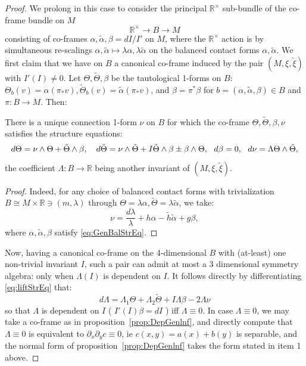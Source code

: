\documentclass[10pt,a4paper]{amsart}
\newcommand{\R}{\mathbb{R}}
\newcommand{\del}{\partial}
\begin{document}
\begin{proof}
    We prolong in this case to consider the principal $\R^\times$ sub-bundle of the co-frame bundle on $M$
    \[ \R^\times \to B\to M \]
    consisting of co-frames $\alpha, \tilde\alpha, \beta = dI/I'$ on $M$, where the $\R^\times$ action is by simultaneous re-scalings $\alpha,\tilde\alpha \mapsto \lambda\alpha, \lambda\tilde\alpha$ on the balanced contact forms $\alpha, \tilde\alpha$. We first claim that we have on $B$ a canonical co-frame induced by the pair $(M,\xi, \tilde \xi)$ with $I'(I)\ne 0$. Let $\Theta, \tilde\Theta, \beta$ be the tautological 1-forms on $B$: $\Theta_b(v) = \alpha(\pi_*v), \tilde\Theta_b(v) = \tilde\alpha(\pi_*v)$, and $\beta = \pi^*\beta$ for $b = (\alpha, \tilde\alpha, \beta)\in B$ and $\pi:B\to M$. Then:
    \begin{lem}
         There is a unique connection 1-form $\nu$ on $B$ for which the co-frame $\Theta, \tilde\Theta, \beta, \nu$ satisfies the structure equations:
    \begin{equation}\label{eq:liftStrEq}
        d\Theta = \nu\wedge\Theta + \tilde\Theta\wedge \beta, ~~~d\tilde\Theta = \nu\wedge\Tilde\Theta + I\tilde\Theta\wedge\beta \pm \beta\wedge\Theta , ~~d\beta = 0, ~~d\nu = \Lambda \Theta\wedge\tilde\Theta,
    \end{equation}
    the coefficient $\Lambda:B\to \R$ being another invariant of $(M,\xi, \tilde \xi)$.
    \end{lem}
    \begin{proof}
        Indeed, for any choice of balanced contact forms with trivialization $B\cong M\times\R\ni (m, \lambda)$ through $\Theta = \lambda\alpha, \tilde\Theta = \lambda \tilde\alpha$, we take:
    \[ \nu = \frac{d\lambda}{\lambda} + h \alpha - \tilde h \tilde\alpha + g\beta,   \]
    where $\alpha, \tilde\alpha, \beta$ satisfy \eqref{eq:GenBalStrEq}.
    \end{proof}
    Now, having a canonical co-frame on the 4-dimensional $B$ with (at-least) one non-trivial invariant $I$, such a pair can admit at most a 3 dimensional symmetry algebra: only when $\Lambda(I)$ is dependent on $I$. It follows directly by differentiating \eqref{eq:liftStrEq} that:
    \[ d\Lambda = \Lambda_1 \Theta + \Lambda_2\tilde\Theta + I\Lambda\beta - 2\Lambda\nu \]
    so that $\Lambda$ is dependent on $I$ ( $I'(I)\beta = dI$ ) iff $\Lambda\equiv 0$. In case $\Lambda\equiv 0$, we may take a co-frame as in proposition~\ref{prop:DepGenlnf}, and directly compute that $\Lambda\equiv 0$ is equivalent to $\del_x\del_y c \equiv 0$, ie $c(x,y) = a(x) + b(y)$ is separable, and the normal form of proposition~\ref{prop:DepGenlnf} takes the form stated in item 1 above.


\end{proof}
\end{document}
